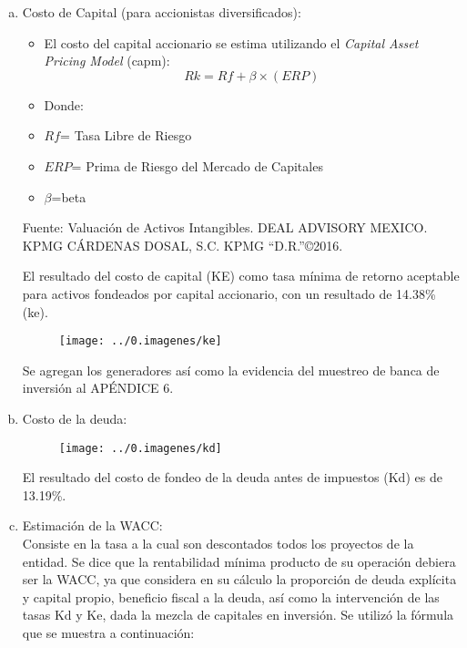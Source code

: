 \begin{enumerate}[a)]
\item Costo de Capital (para accionistas diversificados):\\

\begin{center}
\begin{minipage}{8cm}
\begin{itemize}
\small
				\item El costo del capital accionario se estima utilizando el \textit{Capital Asset Pricing Model} (\gls{capm}):
				$$Rk=Rf+\beta\times(ERP)$$
				 \item Donde:
				 \item $Rf$= Tasa Libre de Riesgo
				 \item $ERP$= Prima de Riesgo del Mercado de Capitales
				 \item $\beta$=\gls{beta}
			\end{itemize}
	\footnotesize{Fuente: Valuaci\'on de Activos Intangibles. DEAL ADVISORY MEXICO. KPMG C\'ARDENAS DOSAL, S.C. KPMG ``D.R.''\copyright 2016.}
		\end{minipage}
\end{center}


El resultado del costo de capital (KE) como tasa mínima de retorno aceptable para activos fondeados por capital accionario, con un resultado de 14.38\% (ke).\\

\begin{figure}
\centering
\texttt{[image: ../0.imagenes/ke]}
\end{figure}

Se agregan los generadores así como la evidencia del muestreo de banca de inversión al APÉNDICE 6.

\item Costo de la deuda:\\

\begin{figure}
\centering
\texttt{[image: ../0.imagenes/kd]}
\end{figure}

El resultado del costo de fondeo de la deuda antes de impuestos (Kd) es de 13.19\%.

\item Estimación de la WACC:\\

Consiste en la tasa a la cual son descontados todos los proyectos de la entidad. Se dice que la rentabilidad mínima producto de su operación debiera ser la WACC, ya que considera en su cálculo la proporción de deuda explícita y capital propio, beneficio fiscal a la deuda, así como la intervención de las tasas Kd y Ke, dada la mezcla de capitales en inversión. Se utilizó la fórmula que se muestra a continuación:\\


\end{enumerate}
